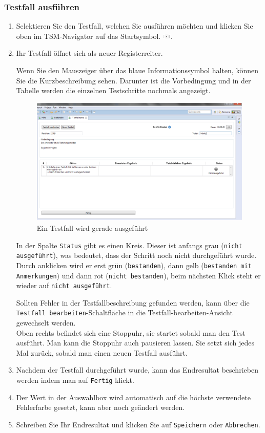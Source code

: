 \documentclass[11pt,a4paper,titlepage]{article}
\begin{document}
\subsubsection{Testfall ausführen}
\begin{enumerate}
\item Selektieren Sie den Testfall, welchen Sie ausführen möchten und klicken Sie oben im TSM-Navigator auf das Startsymbol.
\includegraphics[width= 15px]{BilderHandbuchTSMNavigator/Testfall/Play.png}.
\item Ihr Testfall öffnet sich als neuer Registerreiter.

Wenn Sie den Mauszeiger über das blaue Informationssymbol halten, können Sie die Kurzbeschreibung sehen.
Darunter ist die Vorbedingung und in der Tabelle werden die einzelnen Testschritte nochmals angezeigt.


\begin{figure}[H]
\centering
\includegraphics[width= 470px]{BilderHandbuch/Testfall/Ausfuehren.png}
\caption{Ein Testfall wird gerade ausgeführt}
\label{fig:Ausfuehren}
\end{figure}

In der Spalte \texttt{Status} gibt es einen Kreis.
Dieser ist anfangs grau (\texttt{nicht ausgeführt}), was bedeutet, dass der Schritt noch nicht durchgeführt wurde. Durch anklicken wird er erst grün (\texttt{bestanden}), 
dann gelb (\texttt{bestanden mit Anmerkungen}) und dann rot (\texttt{nicht bestanden}), beim nächsten Klick steht er wieder auf \texttt{nicht ausgeführt}.

Sollten Fehler in der Testfallbeschreibung gefunden werden, kann über die \texttt{Testfall bearbeiten}-Schaltfläche in die Testfall-bearbeiten-Ansicht gewechselt werden. \\
Oben rechts befindet sich eine Stoppuhr, sie startet sobald man den Test ausführt.
Man kann die Stoppuhr auch pausieren lassen. Sie setzt sich jedes Mal zurück, sobald man einen neuen Testfall ausführt.

\item Nachdem der Testfall durchgeführt wurde, kann das Endresultat beschrieben werden indem man auf \texttt{Fertig} klickt.
\item Der Wert in der Auswahlbox wird automatisch auf die höchste verwendete Fehlerfarbe gesetzt, kann aber noch geändert werden.
\item Schreiben Sie Ihr Endresultat und klicken Sie auf \texttt{Speichern} oder \texttt{Abbrechen}.
\end{enumerate}
\end{document}
